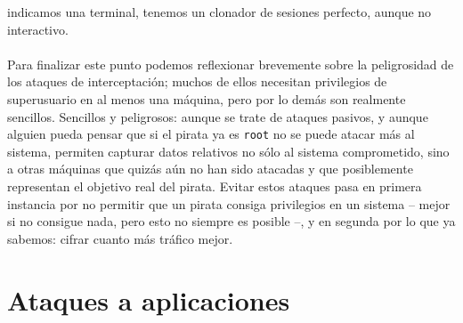 indicamos una terminal, tenemos un clonador de sesiones perfecto, aunque no
interactivo.\\
\\Para finalizar este punto podemos reflexionar brevemente sobre la peligrosidad
de los ataques de interceptaci\'on; muchos de ellos necesitan privilegios de
superusuario en al menos una m\'aquina, pero por lo dem\'as son realmente
sencillos. Sencillos y peligrosos: aunque se trate de ataques pasivos, y aunque
alguien pueda pensar que si el pirata ya es {\tt root} no se puede atacar m\'as
al sistema, permiten capturar datos relativos no s\'olo al sistema comprometido,
sino a otras m\'aquinas que quiz\'as a\'un no han sido atacadas y que 
posiblemente representan el objetivo real del pirata. Evitar estos ataques pasa
en primera instancia por no permitir que un pirata consiga privilegios en un
sistema -- mejor si no consigue nada, pero esto no siempre es posible --, y en
segunda por lo que ya sabemos: cifrar cuanto m\'as tr\'afico mejor.
\section{Ataques a aplicaciones}
